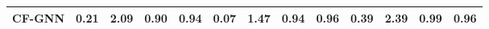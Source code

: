 \begin{table*}[]
{\begin{tabular}{lrrrr rrrr rrrr}
\midrule
CF-GNN               & \textbf{0.21}                              & 2.09                     & 0.90                       & \textbf{0.94}                      & \textbf{0.07}                              & 1.47                     & 0.94                       & \textbf{0.96}                      & \textbf{0.39}                              & 2.39                     & 0.99                       & \textbf{0.96}                 \\
\bottomrule
\end{tabular}
}
\end{table*}